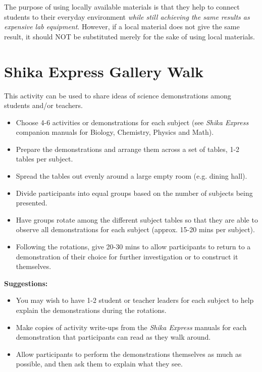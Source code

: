 The purpose of using locally available materials is that they help to connect students to their everyday environment \emph{while still achieving the same results as expensive lab equipment}. However, if a local material does not give the same result, it should NOT be substituted merely for the sake of using local materials.

\section{Shika Express Gallery Walk} 
This activity can be used to share ideas of science demonstrations among students and/or teachers.

\begin{itemize}
\item Choose 4-6 activities or demonstrations for each subject (see \emph{Shika Express} companion manuals for Biology, Chemistry, Physics and Math).
\item Prepare the demonstrations and arrange them across a set of tables, 1-2 tables per subject.
\item Spread the tables out evenly around a large empty room (e.g. dining hall).
\item Divide participants into equal groups based on the number of subjects being presented.
\item Have groups rotate among the different subject tables so that they are able to observe all demonstrations for each subject (approx. 15-20 mins per subject).
\item Following the rotations, give 20-30 mins to allow participants to return to a demonstration of their choice for further investigation or to construct it themselves.
\end{itemize}

\pagebreak

\textbf{Suggestions:}
\begin{itemize}
\item You may wish to have 1-2 student or teacher leaders for each subject to help explain the demonstrations during the rotations. 
\item Make copies of activity write-ups from the \emph{Shika Express} manuals for each demonstration that participants can read as they walk around. 
\item Allow participants to perform the demonstrations themselves as much as possible, and then ask them to explain what they see.
\end{itemize}

